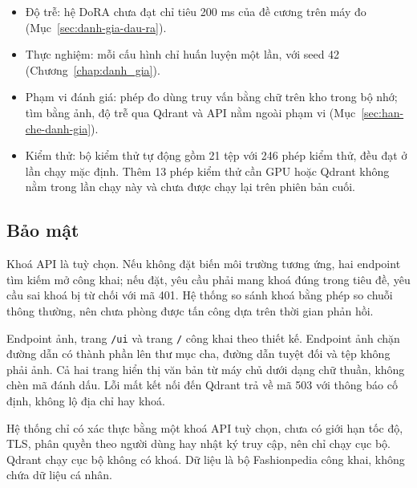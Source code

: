 \begin{itemize}
\item Độ trễ: hệ DoRA chưa đạt chỉ tiêu 200 ms của đề cương trên máy đo (Mục~\ref{sec:danh-gia-dau-ra}).
\item Thực nghiệm: mỗi cấu hình chỉ huấn luyện một lần, với seed 42 (Chương~\ref{chap:danh_gia}).
\item Phạm vi đánh giá: phép đo dùng truy vấn bằng chữ trên kho trong bộ nhớ; tìm bằng ảnh, độ trễ qua Qdrant và API nằm ngoài phạm vi (Mục~\ref{sec:han-che-danh-gia}).
\item Kiểm thử: bộ kiểm thử tự động gồm 21 tệp với 246 phép kiểm thử, đều đạt ở lần chạy mặc định. Thêm 13 phép kiểm thử cần GPU hoặc Qdrant không nằm trong lần chạy này và chưa được chạy lại trên phiên bản cuối.
\end{itemize}

\subsection{Bảo mật}

Khoá API là tuỳ chọn. Nếu không đặt biến môi trường tương ứng, hai endpoint tìm kiếm mở công khai; nếu đặt, yêu cầu phải mang khoá đúng trong tiêu đề, yêu cầu sai khoá bị từ chối với mã 401. Hệ thống so sánh khoá bằng phép so chuỗi thông thường, nên chưa phòng được tấn công dựa trên thời gian phản hồi.

Endpoint ảnh, trang \texttt{/ui} và trang \texttt{/} công khai theo thiết kế. Endpoint ảnh chặn đường dẫn có thành phần lên thư mục cha, đường dẫn tuyệt đối và tệp không phải ảnh. Cả hai trang hiển thị văn bản từ máy chủ dưới dạng chữ thuần, không chèn mã đánh dấu. Lỗi mất kết nối đến Qdrant trả về mã 503 với thông báo cố định, không lộ địa chỉ hay khoá.

Hệ thống chỉ có xác thực bằng một khoá API tuỳ chọn, chưa có giới hạn tốc độ, TLS, phân quyền theo người dùng hay nhật ký truy cập, nên chỉ chạy cục bộ. Qdrant chạy cục bộ không có khoá. Dữ liệu là bộ Fashionpedia công khai, không chứa dữ liệu cá nhân.
